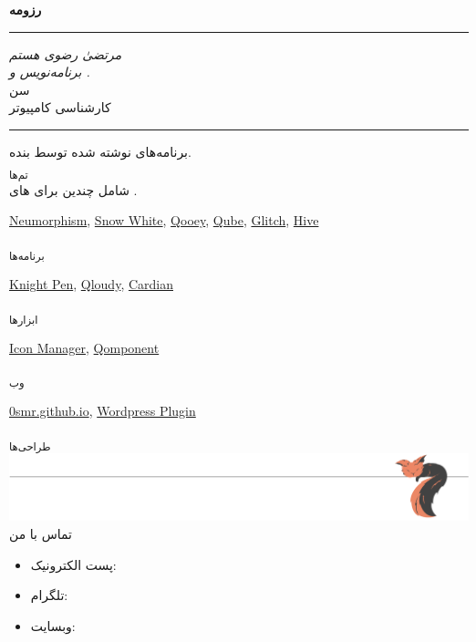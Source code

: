 \begin{center}
	\textbf{رزومه}
	\noindent\textcolor{gray}{\rule{\linewidth}{0.5pt}}
	\textit{
	مرتضیٰ رضوی هستم}\\
	\textit{
	برنامه‌نویس
	 و .}\\[8mm]
	سن
	\myage\smallskip\\
	کارشناسی کامپیوتر
	\noindent\textcolor{gray}{\rule{\linewidth}{0.5pt}}
	برنامه‌های نوشته شده توسط بنده.\\
	\textsubscript{تم‌ها}\\
	شامل چندین
	برای
	های
	.
	\begin{latin}
		\centering
		\href{https://github.com/0smr/qml-neumorphism}{Neumorphism},
		\href{https://github.com/0smr/qml-snow-white}{Snow White},
		\href{https://github.com/0smr/qooey}{Qooey},
		\href{https://github.com/0smr/qube}{Qube},
		\href{https://github.com/0smr/glitch}{Glitch},
		\href{https://github.com/0smr/hive}{Hive}
	\end{latin}
	\vspace{5mm}
	\textsubscript{برنامه‌ها}
	\begin{latin}
		\href{https://github.com/0smr/knight-pen}{Knight Pen},
		\href{https://github.com/0smr/cardian}{Qloudy},
		\href{https://github.com/0smr/cardian}{Cardian}
	\end{latin}
	\textsubscript{ابزارها}
	\begin{latin}
		\centering
		\href{https://github.com/0smr/icon-manager}{Icon Manager},
		\href{https://github.com/0smr/qomponent}{Qomponent}
	\end{latin}
	\vspace{5mm}
	\textsubscript{وب}
	\begin{latin}
		\centering
		\href{https://0smr.github.io}{0smr.github.io},
		\href{https://github.com/0smr/smr-wp-plugin}{Wordpress Plugin}
	\end{latin}
	\vspace{5mm}
	\textsubscript{طراحی‌ها}\\
	\href{https://www.instagram.com/one.red.little.fish}{}
	\includegraphics[width=\linewidth]{./sleeping-fox.pdf}\vspace*{-10mm}
	تماس با من
	\end{center}
	\begin{itemize}[nosep]
		\item \textcolor{gmail}{\faAt}
		پست الکترونیک:
		\href{mailto:97smr0@gmail.com} {}
		\item \textcolor{telegram}{\faSendO}
		تلگرام:
		\href{https://s\_m\_r0.t.me}{}
		\item \textcolor{edge}{\faEdge}
		وبسایت:
		\href{https://0smr.github.io/#contactMe}{}
	\end{itemize}

